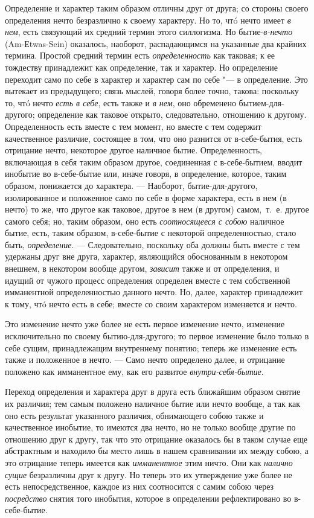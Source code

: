 Определение и характер таким образом отличны друг от друга; со стороны
своего определения нечто безразлично к своему характеру. Но то, чтó нечто
имеет {\em в нем}, есть связующий их средний термин
этого силлогизма. Но бытие-{\em в-нечто}
(Am-Еtwas-Sein) оказалось, наоборот, распадающимся на указанные два крайних
термина. Простой средний термин есть
{\em определенность} как таковая; к ее тождеству
принадлежит как определение, так и характер. Но определение переходит само
по себе в характер и характер сам по себе "--- в определение. Это вытекает из
предыдущего; связь мыслей, говоря более точно, такова: поскольку то, чтó
нечто {\em есть в себе}, есть также и
{\em в нем}, оно обременено бытием-для-другого;
определение как таковое открыто, следовательно, отношению к другому.
Определенность есть вместе с тем момент, но вместе с тем содержит
качественное различие, состоящее в том, что оно разнится от в-себе-бытия,
есть отрицание нечто, некоторое другое наличное бытие. Определенность,
включающая в себя таким образом другое, соединенная с в-себе-бытием, вводит
инобытие во в-себе-бытие или, иначе говоря, в определение, которое, таким
образом, понижается до характера. — Наоборот, бытие-для-другого,
изолированное и положенное само по себе в форме характера, есть в нем (в
нечто) то же, что другое как таковое, другое в нем (в другом) самом,~т.~е.
другое самого себя; но, таким образом, оно есть
{\em соотносящееся с собою} наличное бытие, есть, таким
образом, в-себе-бытие с некоторой определенностью, стало быть,
{\em определение}. — Следовательно, поскольку оба
должны быть вместе с тем удержаны друг вне друга, характер, являющийся
обоснованным в некотором внешнем, в некотором вообще другом,
{\em зависит} также и от определения, и идущий от
чужого процесс определения определен вместе с тем собственной имманентной
определенностью данного нечто. Но, далее, характер принадлежит к тому, чтó
нечто есть в себе; вместе со своим характером изменяется и нечто.

Это изменение нечто уже более не есть первое изменение нечто, изменение
исключительно по своему бытию-для-другого; то первое изменение было только
в себе сущим, принадлежащим внутреннему понятию; теперь же изменение есть
также и положенное в нечто. — Само нечто определено далее, и отрицание
положено как имманентное ему, как его развитое
{\em внутри-себя-бытие}.

Переход определения и характера друг в друга есть ближайшим образом снятие
их различия; тем самым положено наличное бытие или нечто вообще, а так как
оно есть результат указанного различия, обнимающего собою также и
качественное инобытие, то имеются два нечто, но не только вообще другие по
отношению друг к другу, так что это отрицание оказалось бы в таком случае
еще абстрактным и находило бы место лишь в нашем сравнивании их между
собою, а это отрицание теперь имеется как
{\em имманентное} этим ничто. Они как
{\em налично сущие} безразличны друг к другу. Но теперь
это их утверждение уже более не есть непосредственное, каждое из них
соотносится с самим собою через {\em посредство} снятия
того инобытия, которое в определении рефлектировано во в-себе-бытие.

